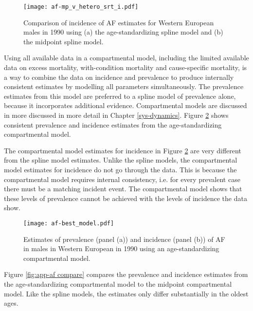     \begin{figure}[h]
        \begin{center}
            \texttt{[image: af-mp\_v\_hetero\_srt\_i.pdf]}
            \caption{Comparison of incidence of AF estimates for Western European
              males in 1990 using (a) the age-standardizing spline model and (b)
              the midpoint spline model.}
            \label{fig:app-af srt i}
        \end{center}
    \end{figure}

Using all available data in a compartmental model, including the
limited available data on excess mortality, with-condition mortality
and cause-specific mortality, is a way to combine the data on
incidence and prevalence to produce internally consistent estimates by modelling all
parameters simultaneously.  The prevalence estimates from this model
are preferred to a spline model of prevalence alone, because it
incorporates additional evidence.  Compartmental models are discussed in
more discussed in more detail in Chapter \ref{sys-dynamics}.  Figure
\ref{fig:app-af age-stand} shows consistent prevalence and incidence estimates
from the age-standardizing compartmental model.

The compartmental model estimates for incidence in Figure \ref{fig:app-af age-stand}
are very different from the spline model estimates.
Unlike the spline models, the compartmental model estimates for
incidence do not go through the data.  This is because the compartmental model
requires internal consistency, i.e. for every prevalent case there must be
a matching incident event.  The compartmental model shows that these levels
of prevalence cannot be achieved with the levels of incidence the data show.

    \begin{figure}[h]
        \begin{center}
            \texttt{[image: af-best\_model.pdf]}
            \caption{Estimates of prevalence (panel (a)) and incidence (panel (b))
              of AF in males in Western European in 1990 using
              an age-standardizing compartmental model.}
            \label{fig:app-af age-stand}
        \end{center}
    \end{figure}

Figure \ref{fig:app-af compare} compares the prevalence and incidence
estimates from the age-standardizing compartmental model to the
midpoint compartmental model.  Like the spline models, the
estimates only differ substantially in the oldest ages.

